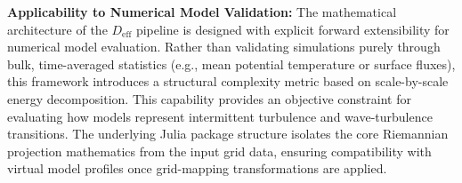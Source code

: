 \textbf{Applicability to Numerical Model Validation:}
The mathematical architecture of the $D_{\mathrm{eff}}$ pipeline is designed with explicit forward extensibility for numerical model evaluation. Rather than validating simulations purely through bulk, time-averaged statistics (e.g., mean potential temperature or surface fluxes), this framework introduces a structural complexity metric based on scale-by-scale energy decomposition. This capability provides an objective constraint for evaluating how models represent intermittent turbulence and wave-turbulence transitions. The underlying Julia package structure isolates the core Riemannian projection mathematics from the input grid data, ensuring compatibility with virtual model profiles once grid-mapping transformations are applied.
